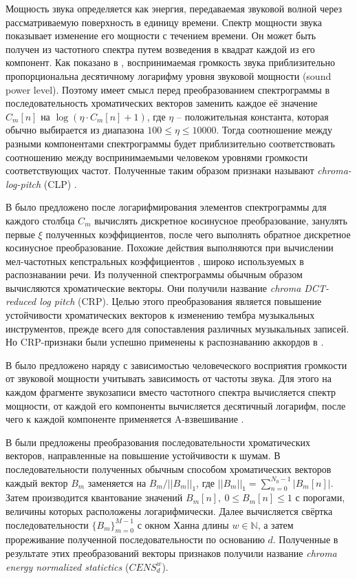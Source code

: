 Мощность звука определяется как энергия, передаваемая звуковой волной через
рассматриваемую поверхность в единицу времени. Спектр мощности звука показывает
изменение его мощности с течением времени. Он может быть получен из частотного
спектра путем возведения в квадрат каждой из его компонент. Как показано в
\cite{Fletcher1933}, воспринимаемая громкость звука приблизительно
пропорциональна десятичному логарифму уровня звуковой мощности (sound power
level). Поэтому имеет смысл перед преобразованием спектрограммы в
последовательность хроматических векторов заменить каждое её значение $C_m[n]$
на $\log (\eta \cdot C_m[n] + 1)$, где $\eta$ -- положительная константа,
которая обычно выбирается из диапазона $100 \leq \eta \leq 10000$. Тогда
соотношение между разными компонентами спектрограммы будет приблизительно
соответствовать соотношению между воспринимаемыми человеком уровнями громкости
соответствующих частот. Полученные таким образом признаки называют
\emph{chroma-log-pitch} (CLP) \cite{Jiang2011}.

В \cite{Mueller2009} было предложено после логарифмирования элементов
спектрограммы для каждого столбца $C_m$ вычислять дискретное косинусное
преобразование, занулять первые $\xi$ полученных коэффициентов, после чего
выполнять обратное дискретное косинусное преобразование. Похожие действия
выполняются при вычислении мел-частотных кепстральных коэффициентов
\cite{Logan2000}, широко используемых в распознавании речи. Из полученной
спектрограммы обычным образом вычисляются хроматические векторы. Они получили
название \emph{chroma DCT-reduced log pitch} (CRP). Целью этого преобразования
является повышение устойчивости хроматических векторов к изменению тембра
музыкальных инструментов, прежде всего для сопоставления различных музыкальных
записей. Но CRP-признаки были успешно применены к распознаванию аккордов в
\cite{Cho2011}.

В \cite{Ni2011} было предложено наряду с зависимостью человеческого восприятия
громкости от звуковой мощности учитывать зависимость от частоты звука. Для этого
на каждом фрагменте звукозаписи вместо частотного спектра вычисляется спектр
мощности, от каждой его компоненты вычисляется десятичный логарифм, после чего к
каждой компоненте применяется A-взвешивание \cite{TalbotSmith1999}.

В \cite{Mueller2007} были предложены преобразования последовательности
хроматических векторов, направленные на повышение устойчивости к шумам.
В последовательности полученных обычным способом хроматических векторов каждый
вектор $B_m$ заменяется на $B_m/||B_m||_1$, где $||B_m||_1 = \sum_{n=0}^{N_0-1}
|B_m[n]|$. Затем производится квантование значений $B_m[n],~0 \leq B_m[n] \leq
1$ с порогами, величины которых расположены логарифмически. Далее вычисляется
свёртка последовательности $\{B_m\}_{m=0}^{M-1}$ с окном Ханна длины $w \in
\mathbb{N}$, а затем прореживание полученной последовательности по основанию
$d$. Полученные в результате этих преобразований векторы признаков получили
название \emph{chroma energy normalized statictics} ($CENS_d^w$).

